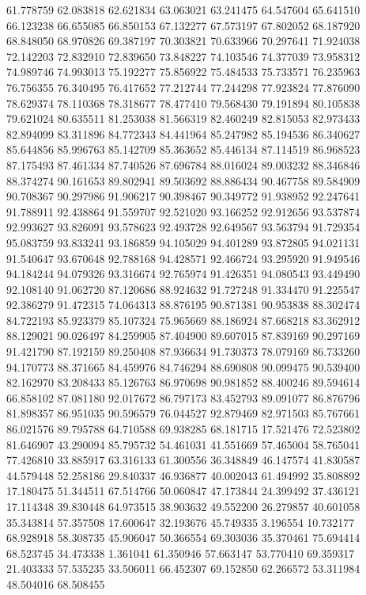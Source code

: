 61.778759
62.083818
62.621834
63.063021
63.241475
64.547604
65.641510
66.123238
66.655085
66.850153
67.132277
67.573197
67.802052
68.187920
68.848050
68.970826
69.387197
70.303821
70.633966
70.297641
71.924038
72.142203
72.832910
72.839650
73.848227
74.103546
74.377039
73.958312
74.989746
74.993013
75.192277
75.856922
75.484533
75.733571
76.235963
76.756355
76.340495
76.417652
77.212744
77.244298
77.923824
77.876090
78.629374
78.110368
78.318677
78.477410
79.568430
79.191894
80.105838
79.621024
80.635511
81.253038
81.566319
82.460249
82.815053
82.973433
82.894099
83.311896
84.772343
84.441964
85.247982
85.194536
86.340627
85.644856
85.996763
85.142709
85.363652
85.446134
87.114519
86.968523
87.175493
87.461334
87.740526
87.696784
88.016024
89.003232
88.346846
88.374274
90.161653
89.802941
89.503692
88.886434
90.467758
89.584909
90.708367
90.297986
91.906217
90.398467
90.349772
91.938952
92.247641
91.788911
92.438864
91.559707
92.521020
93.166252
92.912656
93.537874
92.993627
93.826091
93.578623
92.493728
92.649567
93.563794
91.729354
95.083759
93.833241
93.186859
94.105029
94.401289
93.872805
94.021131
91.540647
93.670648
92.788168
94.428571
92.466724
93.295920
91.949546
94.184244
94.079326
93.316674
92.765974
91.426351
94.080543
93.449490
92.108140
91.062720
87.120686
88.924632
91.727248
91.334470
91.225547
92.386279
91.472315
74.064313
88.876195
90.871381
90.953838
88.302474
84.722193
85.923379
85.107324
75.965669
88.186924
87.668218
83.362912
88.129021
90.026497
84.259905
87.404900
89.607015
87.839169
90.297169
91.421790
87.192159
89.250408
87.936634
91.730373
78.079169
86.733260
94.170773
88.371665
84.459976
84.746294
88.690808
90.099475
90.539400
82.162970
83.208433
85.126763
86.970698
90.981852
88.400246
89.594614
66.858102
87.081180
92.017672
86.797173
83.452793
89.091077
86.876796
81.898357
86.951035
90.596579
76.044527
92.879469
82.971503
85.767661
86.021576
89.795788
64.710588
69.938285
68.181715
17.521476
72.523802
81.646907
43.290094
85.795732
54.461031
41.551669
57.465004
58.765041
77.426810
33.885917
63.316133
61.300556
36.348849
46.147574
41.830587
44.579448
52.258186
29.840337
46.936877
40.002043
61.494992
35.808892
17.180475
51.344511
67.514766
50.060847
47.173844
24.399492
37.436121
17.114348
39.830448
64.973515
38.903632
49.552200
26.279857
40.601058
35.343814
57.357508
17.600647
32.193676
45.749335
3.196554
10.732177
68.928918
58.308735
45.906047
50.366554
69.303036
35.370461
75.694414
68.523745
34.473338
1.361041
61.350946
57.663147
53.770410
69.359317
21.403333
57.535235
33.506011
66.452307
69.152850
62.266572
53.311984
48.504016
68.508455
